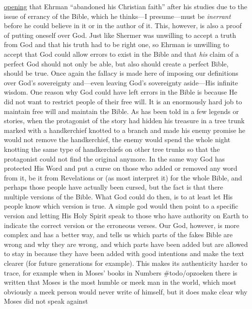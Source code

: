 \href{https://www.reasonablefaith.org/media/debates/is-there-historical-evidence-for-the-resurrection-of-jesus-the-craig-ehrman/}{opening}
that Ehrman ``abandoned his Christian faith'' after his studies due to
the issue of errancy of the Bible, which he thinks---I presume---must be
\emph{inerrant} before he could believe in it or in the author of it.
This, however, is also a proof of putting oneself over God. Just like
Shermer was unwilling to accept a truth from God and that his truth had
to be right one, so Ehrman is unwilling to accept that God could allow
errors to exist in the Bible and that \emph{his} claim of a perfect God
should not only be able, but also should create a perfect Bible, should
be true. Once again the fallacy is made here of imposing our definitions
over God's sovereignty and---even leaving God's sovereignty aside---His
infinite wisdom. One reason why God could have left errors in the Bible
is because He did not want to restrict people of their free will. It is
an enormously hard job to maintain free will and maintain the Bible. As
has been told in a few legends or stories, when the protagonist of the
story had hidden his treasure in a tree trunk marked with a handkerchief
knotted to a branch and made his enemy promise he would not remove the
handkerchief, the enemy would spend the whole night knotting the same
type of handkerchiefs on other tree trunks so that the protagonist could
not find the original anymore. In the same way God has protected His
Word and put a curse on those who added or removed any word from it, be
it from Revelations or (as most interpret it) for the whole Bible, and
perhaps those people have actually been cursed, but the fact is that
there multiple versions of the Bible. What God could do then, is to at
least let His people know which version is true. A simple god would then
point to a specific version and letting His Holy Spirit speak to those
who have authority on Earth to indicate the correct version or the
erroneous verses. Our God, however, is more complex and has a better
way, and tells us which parts of the fakes Bible are wrong and why they
are wrong, and which parts have been added but are allowed to stay in
because they have been added with good intentions and make the text
clearer (for future generations for example). This makes its
authenticity harder to trace, for example when in Moses' books in
Numbers \#todo/opzoeken there is written that Moses is the most humble
or meek man in the world, which most obviously a meek person would never
write of himself, but it does make clear why Moses did not speak against
